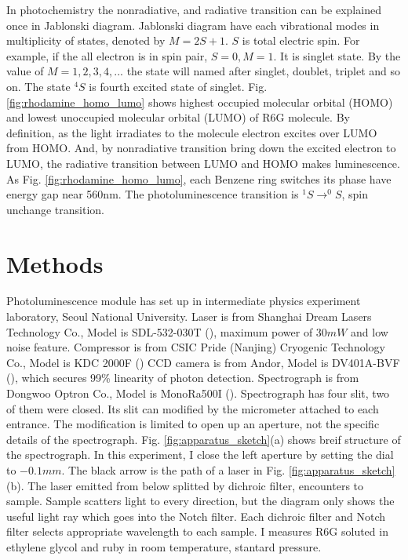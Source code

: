\documentclass{article}
\begin{document}
 In photochemistry the nonradiative, and radiative transition can be explained once in Jablonski diagram.
 Jablonski diagram have each vibrational modes in multiplicity of states, denoted by $M = 2S+1$. $S$ is total electric spin.
 For example, if the all electron is in spin pair, $S=0 , M=1$.
 It is singlet state.
 By the value of $M=1,2,3,4, ... $ the state will named after singlet, doublet, triplet and so on.
 The state $^4S$ is fourth excited state of singlet.
 Fig. \ref{fig:rhodamine_homo_lumo} shows highest occupied molecular orbital (HOMO) and lowest unoccupied molecular orbital (LUMO) of R6G molecule.
 By definition, as the light irradiates to the molecule electron excites over LUMO from HOMO.
 And, by nonradiative transition bring down the excited electron to LUMO, the radiative transition between LUMO and HOMO makes luminescence.
 As Fig. \ref{fig:rhodamine_homo_lumo}, each Benzene ring switches its phase have energy gap near 560nm.
 The photoluminescence transition is $^1S \rightarrow ^0S$, spin unchange transition.

\section{Methods}
 Photoluminescence module has set up in intermediate physics experiment laboratory, Seoul National University.
 Laser is from Shanghai Dream Lasers Technology Co., Model is SDL-532-030T (\cite{laser_spec}), maximum power of $30mW$ and low noise feature.
 Compressor is from CSIC Pride (Nanjing) Cryogenic Technology Co., Model is KDC 2000F (\cite{compressor_spec})
 CCD camera is from Andor, Model is DV401A-BVF (\cite{ccd_spec}), which secures 99\% linearity of photon detection.
 Spectrograph is from Dongwoo Optron Co., Model is MonoRa500I (\cite{spectrograph_spec}).
 Spectrograph has four slit, two of them were closed.
 Its slit can modified by the micrometer attached to each entrance.
 The modification is limited to open up an aperture, not the specific details of the spectrograph.
 Fig. \ref{fig:apparatus_sketch}(a) shows breif structure of the spectrograph.
 In this experiment, I close the left aperture by setting the dial to $-0.1mm$.
 The black arrow is the path of a laser in Fig. \ref{fig:apparatus_sketch}(b).
 The laser emitted from below splitted by dichroic filter, encounters to sample.
 Sample scatters light to every direction, but the diagram only shows the useful light ray which goes into the Notch filter.
 Each dichroic filter and Notch filter selects appropriate wavelength to each sample.
 I measures R6G soluted in ethylene glycol and ruby in room temperature, stantard pressure.
\end{document}
